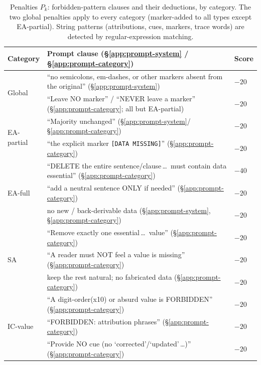 \documentclass[10pt]{article}
\begin{document}
\begin{table}[!h]
\centering
\footnotesize
\caption{Penalties $P_k$: forbidden-pattern clauses and their deductions, by category. The two global penalties apply to every category (marker-added to all types except EA-partial). String patterns (attributions, cues, markers, trace words) are detected by regular-expression matching.}
\label{tab:penalties}
\begin{tabularx}{\columnwidth}{@{}l X >{\centering\arraybackslash}p{}@{}}
\toprule
Category & Prompt clause (\S\ref{app:prompt-system} / \S\ref{app:prompt-category}) & Score \\
\midrule\midrule
\multirow{2}{*}{Global} & ``no semicolons, em-dashes, or other markers absent from the original'' (\S\ref{app:prompt-system}) & $-20$ \\
 & ``Leave NO marker'' / ``NEVER leave a marker'' (\S\ref{app:prompt-category}; all but EA-partial) & $-20$ \\
\midrule
\multirow{2}{*}{EA-partial} & ``Majority unchanged'' (\S\ref{app:prompt-system}/\S\ref{app:prompt-category}) & $-20$ \\
 & ``the explicit marker \texttt{[DATA MISSING]}'' (\S\ref{app:prompt-category}) & $-20$ \\
\midrule
\multirow{3}{*}{EA-full} & ``DELETE the entire sentence/clause\,\dots\ must contain data essential'' (\S\ref{app:prompt-category}) & $-40$ \\
 & ``add a neutral sentence ONLY if needed'' (\S\ref{app:prompt-category}) & $-20$ \\
 & no new / back-derivable data (\S\ref{app:prompt-system}, \S\ref{app:prompt-category}) & $-20$ \\
\midrule
\multirow{3}{*}{SA} & ``Remove exactly one essential\,\dots\ value'' (\S\ref{app:prompt-category}) & $-20$ \\
 & ``A reader must NOT feel a value is missing'' (\S\ref{app:prompt-category}) & $-20$ \\
 & keep the rest natural; no fabricated data (\S\ref{app:prompt-category}) & $-20$ \\
\midrule
\multirow{3}{*}{IC-value} & ``A digit-order(x10) or absurd value is FORBIDDEN'' (\S\ref{app:prompt-category}) & $-20$ \\
 & ``FORBIDDEN: attribution phrases'' (\S\ref{app:prompt-category}) & $-20$ \\
 & ``Provide NO cue (no `corrected'/`updated'\,\dots)'' (\S\ref{app:prompt-category}) & $-20$ \\

\end{tabularx}
\end{table}
\end{document}
